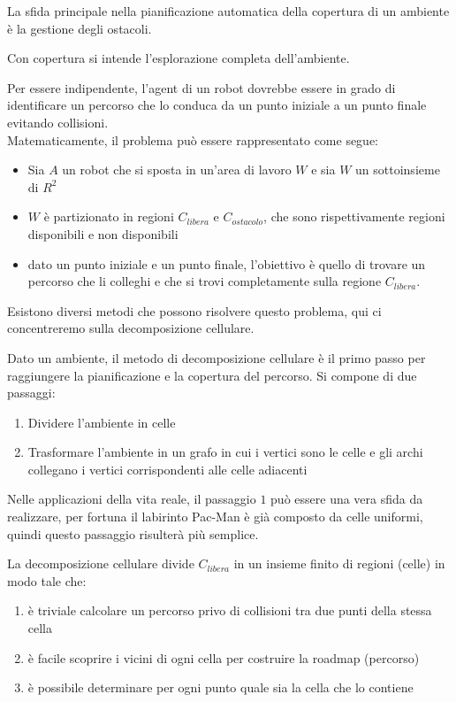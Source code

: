 \documentclass[8pt]{book}
\begin{document}
La sfida principale nella pianificazione automatica della copertura di un ambiente è la gestione degli ostacoli.

Con copertura si intende l'esplorazione completa dell'ambiente.

Per essere indipendente, l'agent di un robot dovrebbe essere in grado di identificare un percorso che lo conduca da un punto iniziale a un punto finale evitando collisioni.\\
Matematicamente, il problema può essere rappresentato come segue:

\begin{itemize}
\item
  Sia $A$ un robot che si sposta in un'area di lavoro $W$ e sia $W$ un sottoinsieme di $R^2$
\item
  $W$ è partizionato in regioni $C_{libera}$ e $C_{ostacolo}$, che sono rispettivamente regioni disponibili e non disponibili
\item
  dato un punto iniziale e un punto finale, l'obiettivo è quello di trovare un percorso che li colleghi e che si trovi completamente sulla regione $C_{libera}$.
\end{itemize}

Esistono diversi metodi che possono risolvere questo problema, qui ci concentreremo sulla decomposizione cellulare.

Dato un ambiente, il metodo di decomposizione cellulare è il primo passo per raggiungere la pianificazione e la copertura del percorso. Si compone di due passaggi:

\begin{enumerate}
\item
  Dividere l'ambiente in celle
\item
  Trasformare l'ambiente in un grafo in cui i vertici sono le celle e gli archi collegano i vertici corrispondenti alle celle adiacenti
\end{enumerate}

Nelle applicazioni della vita reale, il passaggio $1$ può essere una vera sfida da realizzare, per fortuna il labirinto Pac-Man è già composto da celle uniformi, quindi questo passaggio risulterà più semplice.

La decomposizione cellulare divide $C_{libera}$ in un insieme finito di regioni (celle) in modo tale che:

\begin{enumerate}
\item
  è triviale calcolare un percorso privo di collisioni tra due punti della stessa cella
\item
  è facile scoprire i vicini di ogni cella per costruire la roadmap (percorso)
\item
  è possibile determinare per ogni punto quale sia la cella che lo contiene
\end{enumerate}
\end{document}
